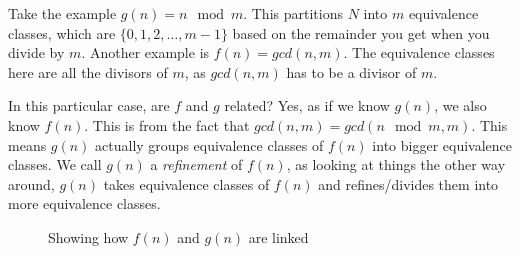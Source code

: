 \documentclass[a4paper,10pt]{article}
\theoremstyle{definition} %
\begin{document}
    Take the example $g(n) = n \mod m$. This partitions $N$ into $m$ equivalence classes, which are 
    $\{0,1,2,\dots,m-1\}$ based on the remainder you get when you divide by $m$. Another 
    example is $f(n) = gcd(n,m)$. The equivalence classes here are all the divisors of $m$, 
    as $gcd(n,m)$ has to be a divisor of $m$.

    In this particular case, are $f$ and $g$ related? Yes, as if we know $g(n)$, we also know 
    $f(n)$. This is from the fact that $gcd(n,m) = gcd(n \mod m, m)$. This means $g(n)$ actually
    groups equivalence classes of $f(n)$ into bigger equivalence classes. We call $g(n)$ a 
    \emph{refinement} of $f(n)$, as looking at things the other way around, $g(n)$ takes equivalence
    classes of $f(n)$ and refines/divides them into more equivalence classes.

    \begin{figure}[H]
    \centering
    \captionsetup{justification=centering}  %
    \caption{Showing how $f(n)$ and $g(n)$ are linked}
    \end{figure}
\end{document}
